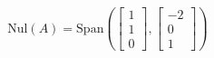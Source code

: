 \documentclass[preview]{standalone}
\begin{document}
\begin{align*}
\text{Nul}(A)  = \text{Span}\left(\begin{bmatrix} 1 \\ 1 \\ 0 \end{bmatrix}, \begin{bmatrix} -2 \\ 0 \\ 1 \end{bmatrix}\right)
\end{align*}
\end{document}

